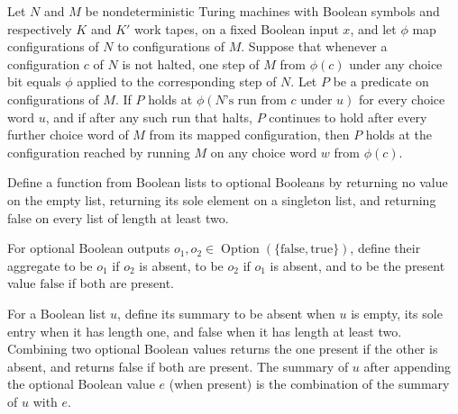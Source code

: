 \begin{theorem}
\label{Randomized.Amplify.reach_comp}
\leanok
{}
Let $N$ and $M$ be nondeterministic Turing machines with Boolean symbols and
respectively $K$ and $K'$ work tapes, on a fixed Boolean input $x$, and let $\phi$ map
configurations of $N$ to configurations of $M$. Suppose that whenever a configuration
$c$ of $N$ is not halted, one step of $M$ from $\phi(c)$ under any choice bit equals
$\phi$ applied to the corresponding step of $N$. Let $P$ be a predicate on
configurations of $M$. If $P$ holds at $\phi(N\text{'s run from }c\text{ under }u)$ for
every choice word $u$, and if after any such run that halts, $P$ continues to hold after
every further choice word of $M$ from its mapped configuration, then $P$ holds at the
configuration reached by running $M$ on any choice word $w$ from $\phi(c)$.
\end{theorem}

\begin{definition}
\label{Randomized.Amplify.summ}
\leanok
Define a function from Boolean lists to optional Booleans by returning no value on the
empty list, returning its sole element on a singleton list, and returning false on every
list of length at least two.
\end{definition}

\begin{definition}
\label{Randomized.Amplify.push}
\leanok
For optional Boolean outputs
$o_1,o_2\in\operatorname{Option}(\{\mathrm{false},\mathrm{true}\})$, define their
aggregate to be $o_1$ if $o_2$ is absent, to be $o_2$ if $o_1$ is absent, and to be the
present value $\mathrm{false}$ if both are present.
\end{definition}

\begin{theorem}
\label{Randomized.Amplify.summ_append}
\leanok
{}
For a Boolean list $u$, define its summary to be absent when $u$ is empty, its sole
entry when it has length one, and false when it has length at least two. Combining two
optional Boolean values returns the one present if the other is absent, and returns
false if both are present. The summary of $u$ after appending the optional Boolean value
$e$ (when present) is the combination of the summary of $u$ with $e$.
\end{theorem}

